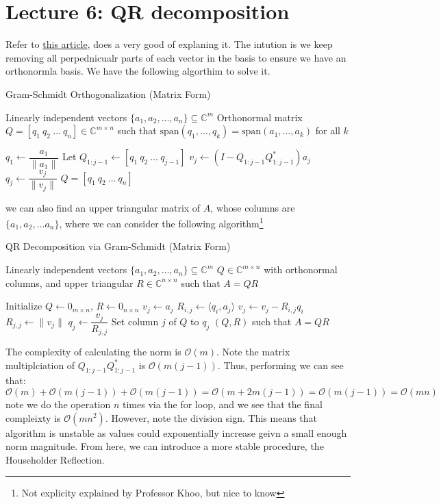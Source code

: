 \documentclass[11pt]{article}
\theoremstyle{definition}
\newcommand{\bigO}[1]{\mathcal{O}\left(#1\right)}
\begin{document}
\section{Lecture 6: QR decomposition}
Refer to \href{https://en.wikipedia.org/wiki/Gram%E2%80%93Schmidt_process#The_Gram%E2%80%93Schmidt_process}{this article}, does a very good of explaning it. The intution is we keep removing all perpednicualr parts of each vector in the basis to ensure we have an orthonormla basis. We have the following algorthim to solve it. 

\begin{algorithm}[H]
  \caption{Gram-Schmidt Orthogonalization (Matrix Form)}
  \begin{algorithmic}[1]
  \Require Linearly independent vectors $\{a_1, a_2, \dots, a_n\} \subseteq \mathbb{C}^m$
  \Ensure Orthonormal matrix $Q = [q_1 \ q_2 \ \dots \ q_n] \in \mathbb{C}^{m \times n}$ such that $\text{span}(q_1, \dots, q_k) = \text{span}(a_1, \dots, a_k)$ for all $k$
  
  \State $q_1 \gets \dfrac{a_1}{\|a_1\|}$
      \State Let $Q_{1:j-1} \gets [q_1 \ q_2 \ \dots \ q_{j-1}]$
      \State $v_j \gets \left(I - Q_{1:j-1} Q_{1:j-1}^*\right)a_j$
      \State $q_j \gets \dfrac{v_j}{\|v_j\|}$
  \EndFor
  \State \Return $Q = [q_1 \ q_2 \ \dots \ q_n]$
  \end{algorithmic}
\end{algorithm}
we can also find an upper triangular matrix of $A$, whose columns are $\{a_1, a_2, \dots a_n \}$, where we can consider the following algorithm\footnote{Not explicity explained by Professor Khoo, but nice to know}
\begin{algorithm}[H]
  \caption{QR Decomposition via Gram-Schmidt (Matrix Form)}
  \begin{algorithmic}[1]
  \Require Linearly independent vectors $\{a_1, a_2, \dots, a_n\} \subseteq \mathbb{C}^m$
  \Ensure $Q \in \mathbb{C}^{m \times n}$ with orthonormal columns, and upper triangular $R \in \mathbb{C}^{n \times n}$ such that $A = QR$
  
  \State Initialize $Q \gets 0_{m \times n}$, $R \gets 0_{n \times n}$
      \State $v_j \gets a_j$
          \State $R_{i,j} \gets \langle q_i, a_j \rangle$
          \State $v_j \gets v_j - R_{i,j} q_i$
      \EndFor
      \State $R_{j,j} \gets \|v_j\|$
      \State $q_j \gets \dfrac{v_j}{R_{j,j}}$
      \State Set column $j$ of $Q$ to $q_j$
  \EndFor
  \State \Return $(Q, R)$ such that $A = QR$
  \end{algorithmic}
\end{algorithm}
The complexity of calculating the norm is $\bigO{m}$. Note the matrix multiplciation of $Q_{1 : j-1}Q^*_{1:j-1}$ is $\bigO{m(j-1)}$. Thus, performing we can see that:
\[
\bigO{m} + \bigO{m(j-1)} + \bigO{m(j-1)} = \bigO{m + 2m(j-1)} = \bigO{m(j-1)} = \bigO{mn}
\]
note we do the operation $n$ times via the for loop, and we see that the final compleixty is $\bigO{mn^2}$. However, note the division sign. This means that algorithm is unstable as values could exponentially increase geivn a small enough norm magnitude. From here, we can introduce a more stable procedure, the Householder Reflection. 
\end{document}
